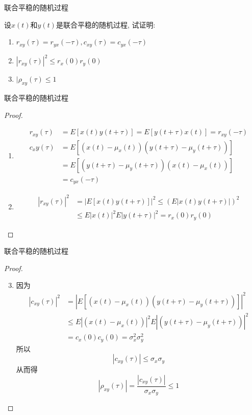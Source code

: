\begin{frame}{联合平稳的随机过程}
\begin{example}
	设$x(t)$和$y(t)$是联合平稳的随机过程, 试证明:
	\begin{enumerate}
		\item $r_{xy}(\tau)=r_{yx}(-\tau),c_{xy}(\tau)=c_{yx}(-\tau)$
		\item $|r_{xy}(\tau)|^2\le r_x(0)r_y(0)$
		\item $|\rho_{xy}(\tau)\le 1$
	\end{enumerate}
\end{example}
\end{frame}

\begin{frame}{联合平稳的随机过程}
\begin{proof}
	\begin{enumerate}
		\item \begin{align*}
		r_{xy}(\tau)&=E[x(t)y(t+\tau)]=E[y(t+\tau)x(t)]=r_{xy}(-\tau)\\
		c_xy(\tau)&=E[(x(t)-\mu_x(t))(y(t+\tau)-\mu_y(t+\tau))]\\
		&=E[(y(t+\tau)-\mu_y(t+\tau))(x(t)-\mu_x(t))]\\
		&=c_{yx}(-\tau)
		\end{align*}
		\item \begin{align*}
		|r_{xy}(\tau)|^2&=|E[x(t)y(t+\tau)]|^2\le (E|x(t)y(t+\tau)|)^2\\
		&\le E|x(t)|^2E|y(t+\tau)|^2=r_x(0)r_y(0)
		\end{align*}
	\end{enumerate}
\end{proof}
\end{frame}

\begin{frame}{联合平稳的随机过程}
\begin{proof}
	\begin{enumerate}
		\setcounter{enumi}{2} %
		\item 因为 
		\begin{align*}
		|c_{xy}(\tau)|^2&=|E[(x(t)-\mu_x(t))(y(t+\tau)-\mu_y(t+\tau))]|^2\\
		&\le E|(x(t)-\mu_x(t))|^2E|(y(t+\tau)-\mu_y(t+\tau))|^2\\
		&=c_x(0)c_y(0)=\sigma_x^2\sigma_y^2
		\end{align*}
		所以 
		\[|c_{xy}(\tau)|\le\sigma_x\sigma_y \]
		从而得
		\[|\rho_{xy}(\tau)|=\frac{|c_{xy}(\tau)|}{\sigma_x\sigma_y}\le 1 \]
	\end{enumerate}
\end{proof}
\end{frame}

